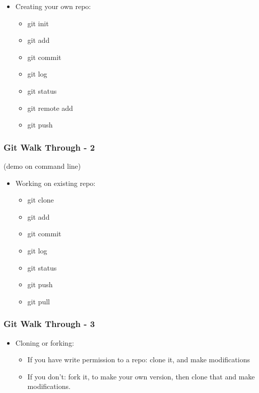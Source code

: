 \begin{itemize}
\itemsep1pt\parskip0pt
\item
  Creating your own repo:

  \begin{itemize}
  \itemsep1pt\parskip0pt
  \item
    git init
  \item
    git add
  \item
    git commit
  \item
    git log
  \item
    git status
  \item
    git remote add
  \item
    git push
  \end{itemize}
\end{itemize}

\subsubsection{Git Walk Through - 2}\label{git-walk-through---2}

(demo on command line)

\begin{itemize}
\itemsep1pt\parskip0pt
\item
  Working on existing repo:

  \begin{itemize}
  \itemsep1pt\parskip0pt
  \item
    git clone
  \item
    git add
  \item
    git commit
  \item
    git log
  \item
    git status\\
  \item
    git push
  \item
    git pull
  \end{itemize}
\end{itemize}

\subsubsection{Git Walk Through - 3}\label{git-walk-through---3}

\begin{itemize}
\itemsep1pt\parskip0pt
\item
  Cloning or forking:

  \begin{itemize}
  \itemsep1pt\parskip0pt
  \item
    If you have write permission to a repo: clone it, and make
    modifications
  \item
    If you don't: fork it, to make your own version, then clone that and
    make modifications.
  \end{itemize}
\end{itemize}

